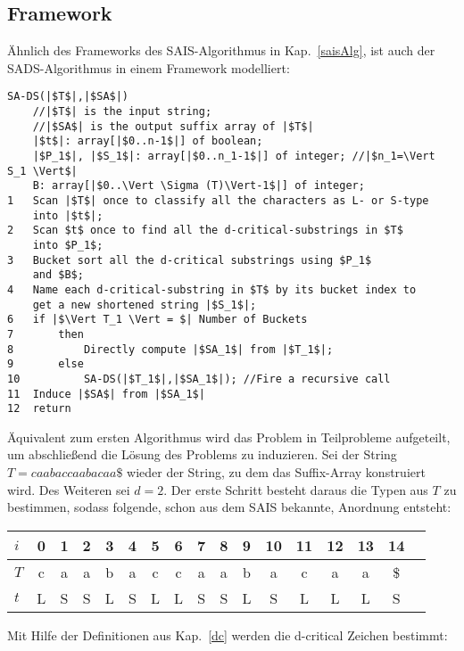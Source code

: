 \subsection{Framework}
Ähnlich des Frameworks des SAIS-Algorithmus in Kap.~\ref{saisAlg}, ist auch der SADS-Algorithmus in einem Framework\cite[fig.~3]{saca:6} modelliert:
\label{sadsAlg}
\begin{verbatim}
SA-DS(|$T$|,|$SA$|)
    //|$T$| is the input string;
    //|$SA$| is the output suffix array of |$T$|
    |$t$|: array[|$0..n-1$|] of boolean;
    |$P_1$|, |$S_1$|: array[|$0..n_1-1$|] of integer; //|$n_1=\Vert S_1 \Vert$|
    B: array[|$0..\Vert \Sigma (T)\Vert-1$|] of integer;
1   Scan |$T$| once to classify all the characters as L- or S-type
    into |$t$|;
2   Scan $t$ once to find all the d-critical-substrings in $T$
    into $P_1$;
3   Bucket sort all the d-critical substrings using $P_1$
    and $B$;
4   Name each d-critical-substring in $T$ by its bucket index to
    get a new shortened string |$S_1$|;
6   if |$\Vert T_1 \Vert = $| Number of Buckets
7       then
8           Directly compute |$SA_1$| from |$T_1$|;
9       else
10          SA-DS(|$T_1$|,|$SA_1$|); //Fire a recursive call
11  Induce |$SA$| from |$SA_1$|
12  return
\end{verbatim}


\noindent Äquivalent zum ersten Algorithmus wird das Problem in Teilprobleme aufgeteilt, um abschließend die Lösung des Problems zu induzieren.
Sei der String $T = caabaccaabacaa\$$ wieder der String, zu dem das Suffix-Array konstruiert wird. Des Weiteren sei $d = 2$. Der erste Schritt besteht daraus die Typen aus $T$
zu bestimmen, sodass folgende, schon aus dem SAIS bekannte, Anordnung entsteht:

\begin{center}
  \begin{tabular}{ | l | c | c | c | c | c | c | c | c | c | c | c | c | c | c | c | c | }
    \hline
        $i$ & 0 & 1 & 2 & 3 & 4 & 5 & 6 & 7 & 8 & 9 & 10 & 11 & 12 & 13 & 14 \\ \hline
        $T$ & c & a & a & b & a & c & c & a & a & b & a & c & a & a & \$ \\ \hline
        $t$ & L & S & S & L & S & L & L & S & S & L & S & L & L & L & S \\
    \hline
  \end{tabular}
\end{center}
\bigskip

\newpage
\noindent Mit Hilfe der Definitionen aus Kap.~\ref{dc} werden die d-critical Zeichen bestimmt:

